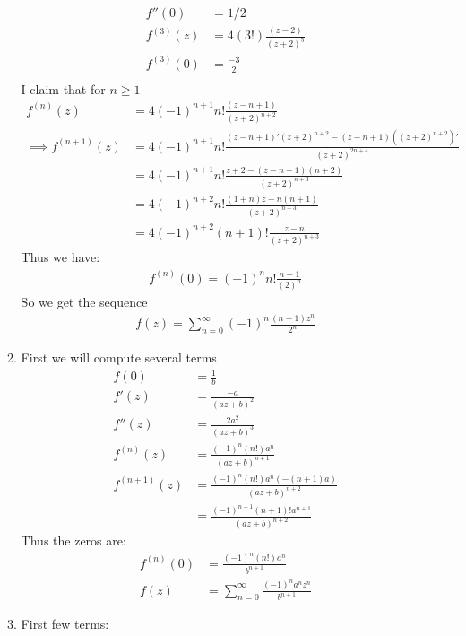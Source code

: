 \documentclass{article}
\begin{document}
\begin{enumerate}
\begin{enumerate}[label=(\roman*)]
\begin{align*}
            f''(0)&=1/2\\
            f^{(3)}(z)&=4(3!)\frac{(z-2)}{(z+2)^5}\\
            f^{(3)}(0)&=\frac{-3}{2}\\
          \end{align*}
           I claim that for $n\geq1$
          \begin{align*}
            f^{(n)}(z)&=4(-1)^{n+1}n!\frac{(z-n+1)}{(z+2)^{n+2}}\\
            \implies f^{(n+1)}(z)&=4(-1)^{n+1}n!\frac{(z-n+1)'(z+2)^{n+2}-(z-n+1)((z+2)^{n+2})'}{(z+2)^{2n+4}}\\
            &=4(-1)^{n+1}n!\frac{z+2-(z-n+1)(n+2)}{(z+2)^{n+3}}\\
            &=4(-1)^{n+2}n!\frac{(1+n)z-n(n+1)}{(z+2)^{n+3}}\\
            &=4(-1)^{n+2}(n+1)!\frac{z-n}{(z+2)^{n+3}}
          \end{align*}
          Thus we have:
          \begin{align*}
            f^{(n)}(0)=(-1)^{n}n!\frac{n-1}{(2)^{n}}
          \end{align*}
          So we get the sequence
          \begin{align*}
            f(z)=\sum_{n=0}^\infty(-1)^{n}\frac{(n-1)z^n}{2^n}
          \end{align*}
        \item
          First we will compute several terms
          \begin{align*}
            f(0)&=\frac{1}{b}\\
            f'(z)&=\frac{-a}{(az+b)^2}\\
            f''(z)&=\frac{2a^2}{(az+b)^3}\\
            f^{(n)}(z)&=\frac{(-1)^n(n!)a^n}{(az+b)^{n+1}}\\
            f^{(n+1)}(z)&=\frac{(-1)^{n}(n!)a^n(-(n+1)a)}{(az+b)^{n+2}}\\
            &=\frac{(-1)^{n+1}(n+1)!a^{n+1}}{(az+b)^{n+2}}
          \end{align*}
          Thus the zeros are:
          \begin{align*}
            f^{(n)}(0)&=\frac{(-1)^n(n!)a^n}{b^{n+1}}\\
            f(z)&=\sum_{n=0}^\infty\frac{(-1)^na^nz^n}{b^{n+1}}
          \end{align*}
        \item
          First few terms:
          \begin{align*}

\end{align*}
\end{enumerate}
\end{enumerate}
\end{document}
